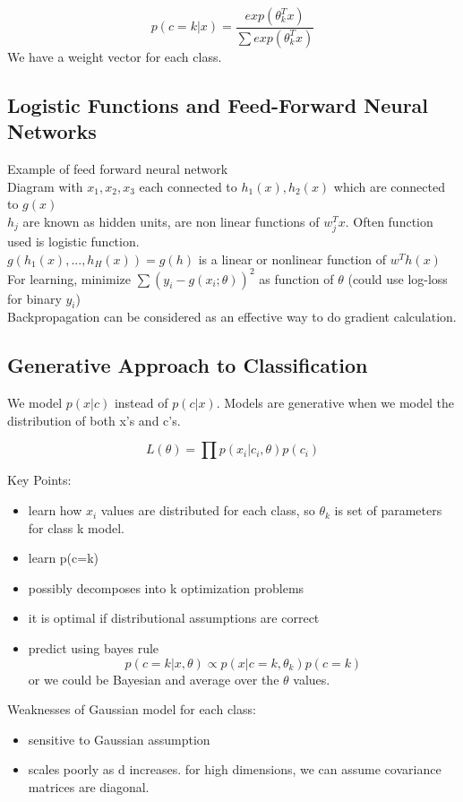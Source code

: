 \documentclass[11pt,psfig]{article}
\begin{document}
\[
p(c=k|x) = \frac{exp(\theta_k^T x)}{\sum{exp(\theta_k^Tx)}}
\]
We have a weight vector for each class. 

\subsection*{Logistic Functions and Feed-Forward Neural Networks}

Example of feed forward neural network\\
Diagram with $x_1,x_2,x_3$ each connected to $h_1(x),h_2(x)$ which are connected to $g(x)$\\
$h_j$ are known as hidden units, are non linear functions of $w_j^Tx$. Often function used is logistic function. \\
$g( h_1(x),...,h_H(x)) = g(h)$ is a linear or nonlinear function of $w^Th(x)$\\
For learning, minimize $\sum{(y_i-g(x_i;\theta))^2}$ as function of $\theta$ (could use log-loss for binary $y_i$)\\
Backpropagation can be considered as an effective way to do gradient calculation.

\subsection*{Generative Approach to Classification}

We model $p(x|c)$ instead of $p(c|x)$. Models are generative when we model the distribution of both x's and c's. 

\[
L(\theta) = \prod{p(x_i|c_i,\theta)p(c_i)}
\]

Key Points:
\begin{itemize}
\item learn how $x_i$ values are distributed for each class, so $\theta_k$ is set of parameters for class k model.
\item learn p(c=k)
\item possibly decomposes into k optimization problems
\item it is optimal if distributional assumptions are correct
\item predict using bayes rule\[
p(c=k|x,\theta)\propto p(x|c=k,\theta_k)p(c=k)
\]  or we could be Bayesian and average over the $\theta$ values. 
\end{itemize}

Weaknesses of Gaussian model for each class:
\begin{itemize}
\item sensitive to Gaussian assumption
\item scales poorly as d increases. for high dimensions, we can assume covariance matrices are diagonal. 
\end{itemize}
\end{document}
